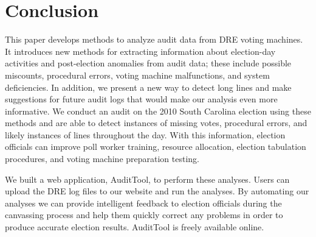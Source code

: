 \documentclass[letterpaper,twocolumn,10pt]{article}
\begin{document}
\section{Conclusion}
This paper develops methods to analyze audit data from DRE voting machines. It 
introduces new methods for extracting information about election-day activities
and post-election anomalies from audit data; these include 
possible miscounts, procedural errors, voting machine malfunctions, and system 
deficiencies. In addition, we present a new way to detect long lines and make
suggestions for future audit logs that would make our analysis even more
informative. We conduct an audit on the 2010 South Carolina 
election using these methods and are able to detect instances of missing votes,
procedural errors, and likely instances of lines throughout the day. With this
information, election officials can improve poll worker 
training, resource allocation, election tabulation procedures, and 
voting machine preparation testing.  
 
We built a web application, AuditTool, to perform these analyses. Users can
upload the DRE log files to our website and run the analyses. By automating our
analyses we can provide intelligent feedback to election officials during the
canvassing process and help them quickly correct any problems in order to
produce accurate election results. AuditTool is freely available online.  
 


{\footnotesize 
}


\end{document}
